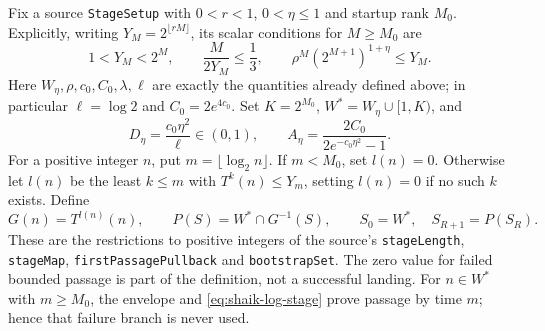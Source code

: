\documentclass[11pt]{article}
\theoremstyle{remark}\newtheorem{remark}[proposition]{Remark}
\begin{document}
Fix a source \texttt{StageSetup} with \(0<r<1\), \(0<\eta\le1\)
and startup rank \(M_0\). Explicitly, writing
\(Y_M=2^{\lfloor rM\rfloor}\), its scalar conditions for \(M\ge M_0\)
are
\begin{equation}\label{eq:shaik-log-stage}
 1<Y_M<2^M,\qquad \frac{M}{2Y_M}\le\frac13,\qquad
 \rho^M(2^{M+1})^{1+\eta}\le Y_M .
\end{equation}
Here \(W_\eta,\rho,c_0,C_0,\lambda,\ell\) are exactly the quantities
already defined above; in particular \(\ell=\log2\) and
\(C_0=2e^{4c_0}\).
Set \(K=2^{M_0}\), \(W^*=W_\eta\cup[1,K)\), and
\[
 D_\eta=\frac{c_0\eta^2}{\ell}\in(0,1),\qquad
 A_\eta=\frac{2C_0}{2e^{-c_0\eta^2}-1}.
\]
For a positive integer \(n\), put \(m=\lfloor\log_2n\rfloor\).
If \(m<M_0\), set \(l(n)=0\).
Otherwise let \(l(n)\) be the least \(k\le m\) with
\(T^k(n)\le Y_m\), setting \(l(n)=0\) if no such \(k\) exists.
Define
\[
 G(n)=T^{l(n)}(n),\qquad
 P(S)=W^*\cap G^{-1}(S),\qquad
 S_0=W^*,\quad S_{R+1}=P(S_R).
\]
These are the restrictions to positive integers of the source's
\texttt{stageLength}, \texttt{stageMap}, \texttt{firstPassagePullback}
and \texttt{bootstrapSet}. The zero value for failed bounded passage
is part of the definition, not a successful landing. For \(n\in W^*\)
with \(m\ge M_0\), the envelope and \eqref{eq:shaik-log-stage}
prove passage by time \(m\); hence that failure branch is never used.
\end{document}
